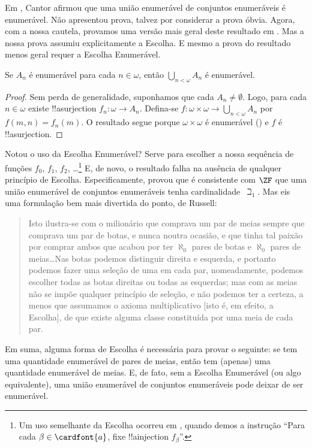 \documentclass[../../../include/open-logic-section]{subfiles}
\begin{document}
\begin{ex} 
Em \citeyear{Cantor1878}, Cantor afirmou que uma união enumerável de
conjuntos enumeráveis é enumerável. Não apresentou prova, talvez
por considerar a prova óbvia. Agora, com a nossa cautela, provamos uma versão mais geral deste resultado em
. Mas a nossa prova
assumiu explicitamente a Escolha. E mesmo a prova do resultado menos geral
requer a Escolha Enumerável.

\begin{thm}
Se $A_n$ é enumerável para cada $n \in \omega$, então $\bigcup_{n <
\omega} A_n$ é enumerável.
\end{thm}

\begin{proof}
Sem perda de generalidade, suponhamos que cada $A_n \neq \emptyset$. Logo,
para cada $n \in \omega$ existe !!a{surjection} $f_n \colon \omega
\to A_n$. Defina-se $f \colon \omega \times \omega \to \bigcup_{n <
\omega} A_n$ por $f(m, n) = f_n(m)$. O resultado segue porque $\omega
\times \omega$ é enumerável
() e $f$ é
!!a{surjection}.
\end{proof}
\noindent 
Notou o uso da Escolha Enumerável? Serve para escolher a nossa
sequência de funções $f_0$, $f_1$, $f_2$, \dots\footnote{Um uso semelhante
da Escolha ocorreu em
, quando demos a
instrução ``Para cada $\beta \in \cardfont{a}$, fixe !!a{injection}
$f_\beta$''.} E, de novo, o resultado falha na ausência de qualquer princípio de Escolha.
Especificamente, \citet{FefermanLevy1963} provou que é
consistente com $\ZF$ que uma união enumerável de conjuntos enumeráveis tenha
cardinalidade~$\beth_1$. Mas eis uma formulação bem mais divertida do
ponto, de Russell:
\begin{quote}
  Isto ilustra-se com o milionário que comprava um par de meias
  sempre que comprava um par de botas, e nunca noutra ocasião, e que
  tinha tal paixão por comprar ambos que acabou por ter
  $\aleph_0$ pares de botas e $\aleph_0$ pares de meias\dots\@ Nas botas
  podemos distinguir direita e esquerda, e portanto podemos fazer uma
  seleção de uma em cada par, nomeadamente, podemos escolher todas as
  botas direitas ou todas as esquerdas; mas com as meias não se impõe
  qualquer princípio de seleção, e não podemos ter a certeza, a menos que
  assumamos o axioma multiplicativo [isto é, em efeito, a Escolha], de que
  existe alguma classe constituída por uma meia de cada par.
  \citep[p.~126]{Russell1919}
\end{quote}
Em suma, alguma forma de Escolha é necessária para provar o seguinte: se
tem uma quantidade enumerável de pares de meias, então tem (apenas) uma quantidade enumerável de
meias. E, de fato, sem a Escolha Enumerável (ou algo equivalente), uma união enumerável de conjuntos enumeráveis pode deixar de ser
enumerável. 
\end{ex}
\end{document}
